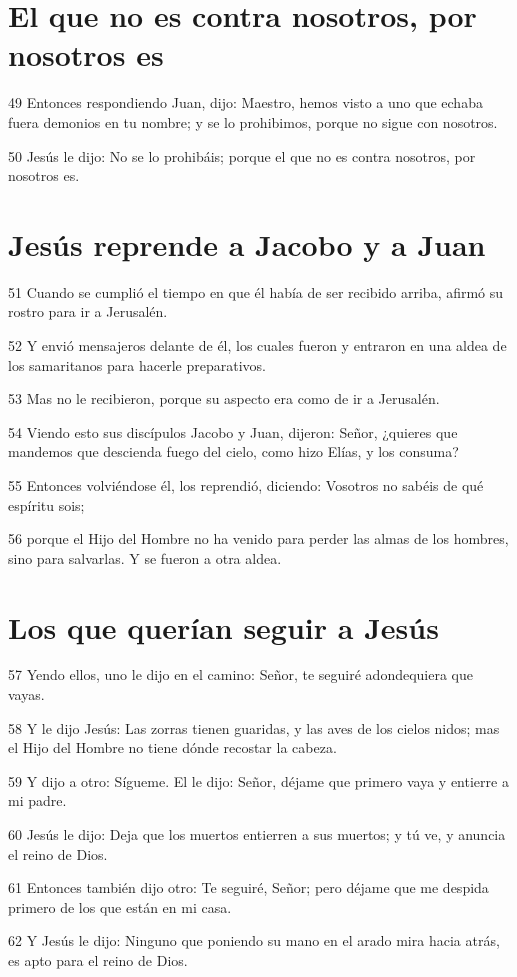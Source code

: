 \section*{El que no es contra nosotros, por nosotros es}

\par 49 Entonces respondiendo Juan, dijo: Maestro, hemos visto a uno que echaba fuera demonios en tu nombre; y se lo prohibimos, porque no sigue con nosotros.
\par 50 Jesús le dijo: No se lo prohibáis; porque el que no es contra nosotros, por nosotros es.

\section*{Jesús reprende a Jacobo y a Juan}

\par 51 Cuando se cumplió el tiempo en que él había de ser recibido arriba, afirmó su rostro para ir a Jerusalén.
\par 52 Y envió mensajeros delante de él, los cuales fueron y entraron en una aldea de los samaritanos para hacerle preparativos.
\par 53 Mas no le recibieron, porque su aspecto era como de ir a Jerusalén.
\par 54 Viendo esto sus discípulos Jacobo y Juan, dijeron: Señor, ¿quieres que mandemos que descienda fuego del cielo, como hizo Elías, y los consuma?
\par 55 Entonces volviéndose él, los reprendió, diciendo: Vosotros no sabéis de qué espíritu sois;
\par 56 porque el Hijo del Hombre no ha venido para perder las almas de los hombres, sino para salvarlas. Y se fueron a otra aldea.

\section*{Los que querían seguir a Jesús}

\par 57 Yendo ellos, uno le dijo en el camino: Señor, te seguiré adondequiera que vayas.
\par 58 Y le dijo Jesús: Las zorras tienen guaridas, y las aves de los cielos nidos; mas el Hijo del Hombre no tiene dónde recostar la cabeza.
\par 59 Y dijo a otro: Sígueme. El le dijo: Señor, déjame que primero vaya y entierre a mi padre.
\par 60 Jesús le dijo: Deja que los muertos entierren a sus muertos; y tú ve, y anuncia el reino de Dios.
\par 61 Entonces también dijo otro: Te seguiré, Señor; pero déjame que me despida primero de los que están en mi casa.
\par 62 Y Jesús le dijo: Ninguno que poniendo su mano en el arado mira hacia atrás, es apto para el reino de Dios.

